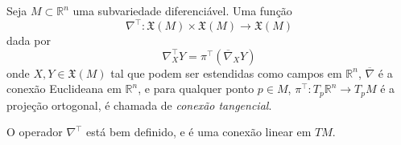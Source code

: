 \begin{definicao}
	Seja $M \subset \mathbb{R}^n$ uma subvariedade diferenciável. Uma função
	\begin{equation*}
		\nabla^\top: \mathfrak{X}(M) \times \mathfrak{X}(M) \rightarrow \mathfrak{X}(M)
	\end{equation*}
	dada por
	\begin{equation*}
		\nabla^\top_X Y = \pi^\top \left( \overline{\nabla}_X Y \right)
	\end{equation*}
	onde $X,Y \in \mathfrak{X}(M)$ tal que podem ser estendidas como campos em $\mathbb{R}^n$, $\overline{\nabla}$ é a conexão Euclideana em $\mathbb{R}^n$, e para qualquer ponto $p \in M$, $\pi^\top: T_p \mathbb{R}^n \rightarrow T_p M$ é a projeção ortogonal, é chamada de \emph{conexão tangencial}.
\end{definicao}

\begin{lema}
	O operador $\nabla^\top$ está bem definido, e é uma conexão linear em $TM$.
\end{lema}

